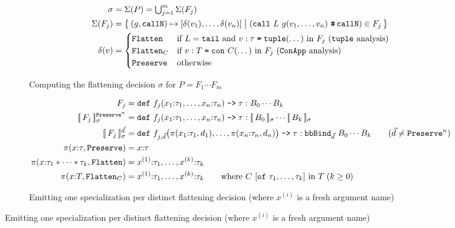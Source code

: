 \begin{figure}[htbp]
  \centering
  \footnotesize
  \captionsetup[subfigure]{aboveskip=2pt,belowskip=0pt}
  \setlength{\abovedisplayskip}{1pt}
  \setlength{\belowdisplayskip}{1pt}
  \setlength{\jot}{1pt}
  \begin{subfigure}{\textwidth}
    \caption{Computing the flattening decision $\sigma$ for $P = F_1 \cdots F_m$}
    \label{fig:preflatten_analysis}
    \[
    \begin{aligned}
      \sigma
        &= \Sigma(P) = \textstyle\bigcup_{j=1}^{m} \Sigma(F_j) \\
      \Sigma(F_j)
        &= \big\{\, (g, \texttt{callN}) \mapsto [\delta(v_1), \dots, \delta(v_n)]
           \;\big|\; (\mathtt{call}\ L\ g(v_1, \dots, v_n)\ \texttt{\#\,callN}) \in F_j \,\big\} \\
      \delta(v)
        &= \begin{cases}
             \texttt{Flatten}   & \text{if } L = \mathtt{tail} \text{ and } v : \tau \syneq \mathtt{tuple}(\dots) \text{ in } F_j \text{ (\texttt{tuple} analysis)} \\
             \texttt{Flatten}_C & \text{if } v : T \syneq \mathtt{con}\ C(\dots) \text{ in } F_j \text{ (\texttt{ConApp} analysis)} \\
             \texttt{Preserve}  & \text{otherwise}
           \end{cases}
    \end{aligned}
    \]
  \end{subfigure}

  \begin{subfigure}{\textwidth}
    \caption{Emitting one specialization per distinct flattening decision (where $x^{(i)}$ is a fresh argument name)}
    \label{fig:preflatten_emit_new}
    \[
    \begin{aligned}
      F_j
        &= \mathtt{def}\ f_j(x_1{:}\tau_1, \dots, x_n{:}\tau_n) \mathrel{\texttt{->}} \tau : B_0 \cdots B_k \\
      \flatsem{F_j}^{\texttt{Preserve}^n}
        &= \mathtt{def}\ f_j(x_1{:}\tau_1, \dots, x_n{:}\tau_n) \mathrel{\texttt{->}} \tau : \flatsem{B_0} \cdots \flatsem{B_k} \\
      \flatsem{F_j}^{\vec{d}}
        &= \mathtt{def}\ f_{j,\vec{d}}\big(\pi(x_1{:}\tau_1, d_1), \dots, \pi(x_n{:}\tau_n, d_n)\big) \mathrel{\texttt{->}} \tau :
           \mathtt{bbBind}_{\vec{d}}\ B_0 \cdots B_k
           \qquad (\vec{d} \neq \texttt{Preserve}^n) \\
      \pi(x{:}\tau, \texttt{Preserve}) &= x{:}\tau \\
      \pi(x{:}\tau_1 * \cdots * \tau_k, \texttt{Flatten}) &= x^{(1)}{:}\tau_1, \dots, x^{(k)}{:}\tau_k \\
      \pi(x{:}T, \texttt{Flatten}_C) &= x^{(1)}{:}\tau_1, \dots, x^{(k)}{:}\tau_k
        \qquad \text{where } C\ [\mathtt{of}\ \tau_1, \dots, \tau_k] \text{ in } T\; (k \ge 0)
    \end{aligned}
    \]
  \end{subfigure}


\end{figure}
